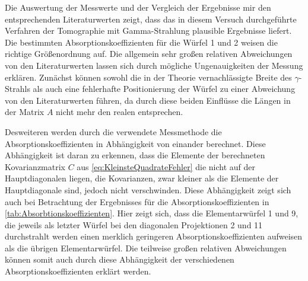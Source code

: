 
Die Auswertung der Messwerte und der Vergleich der Ergebnisse mir den entsprechenden 
Literaturwerten zeigt, dass das in diesem Versuch durchgeführte Verfahren 
der Tomographie mit Gamma-Strahlung plausible Ergebnisse liefert. Die bestimmten 
Absorptionskoeffizienten für die Würfel 1 und 2 weisen die richtige Größenordnung 
auf. Die allgemein sehr großen relativen Abweichungen von den Literaturwerten lassen 
sich durch mögliche Ungenauigkeiten der Messung erklären. 
Zunächst können sowohl die in der Theorie vernachlässigte Breite des $\gamma$-Strahls
als auch eine fehlerhafte Positionierung der Würfel zu einer Abweichung von 
den Literaturwerten führen, da durch diese beiden Einflüsse die Längen in der Matrix $A$ 
nicht mehr den realen entsprechen.

Desweiteren werden durch die verwendete Messmethode die Absorptionskoeffizienten in Abhängigkeit 
von einander berechnet. Diese Abhängigkeit ist daran zu erkennen, dass die Elemente der 
berechneten Kovarianzmatrix $C$ aus \cref{eq:KleinsteQuadrateFehler} die nicht auf der Hauptdiagonalen
liegen, die Kovarianzen, zwar kleiner als die Elemente der Hauptdiagonale sind, jedoch nicht verschwinden.
Diese Abhängigkeit zeigt sich auch bei Betrachtung der Ergebnisses für die Absorptionskoeffizienten in 
\cref{tab:Absorbtionskoeffizienten}. Hier zeigt sich, dass die Elementarwürfel 1 und 9, die jeweils
als letzter Würfel bei den diagonalen Projektionen 2 und 11 durchstrahlt werden einen merklich geringeren 
Absorptionskoeffizienten aufweisen als die übrigen Elementarwürfel. Die teilweise großen relativen 
Abweichungen  können somit auch durch diese Abhängigkeit der verschiedenen Absorptionskoeffizienten erklärt werden.
 